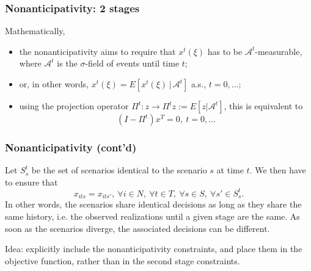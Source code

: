 \documentclass[french]{beamer}
\begin{document}
\begin{frame}
\frametitle{Nonanticipativity: 2 stages}

\begin{minipage}{0.45\textwidth}
\begin{center}
\hspace*{1cm} 
\end{center}
\end{minipage}
\hfill
\begin{minipage}{0.45\textwidth}
\begin{center}
\end{center}
\end{minipage}

Mathematically,
\begin{itemize}
\item
the nonanticipativity aims to require that $x^t(\xi)$ has to be $\mathcal{A}^t$-measurable, where $\mathcal{A}^t$ is the $\sigma$-field of events until time $t$;
\item
or, in other words, $x^t(\xi) = E[x^t(\xi) \,|\, \mathcal{A}^t]$ a.s., $t = 0,\ldots$;
\item
using the projection operator $\Pi^t: z \rightarrow \Pi^t z := E[ z | \mathcal{A}^t]$, this is equivalent to
\[
(I-\Pi^t)x^T = 0,\ t = 0,\ldots
\]
\end{itemize}

\end{frame}

\begin{frame}
\frametitle{Nonanticipativity (cont'd)}

Let $S_s^t$ be the set of scenarios identical to the  scenario $s$ at time $t$.
We then have to ensure that
\[
x_{its} = x_{its'},\ \forall i \in N,\ \forall t \in T,\ \forall s \in
S,\ \forall s' \in S_s^t.
\]
In other words, the scenarios share identical decisions as long as they share the same history, i.e. the observed realizations until a given stage are the same.
As soon as the scenarios diverge, the associated decisions can be different.

\mbox{}

{\red Idea}: explicitly include the nonanticipativity constraints, and place them in the objective function, rather than in the second stage constraints.

\end{frame}
\end{document}
